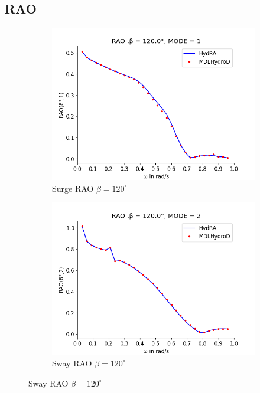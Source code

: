 \subsection{RAO}
\begin{figure}[H]
    \centering
    \begin{subfigure}[b]{0.49\textwidth}
        \includegraphics[width=\textwidth]{plots/kcs/rao/rao1.png}
        \caption{Surge RAO $\beta = 120^{\circ}$}
    \end{subfigure}
    \begin{subfigure}[b]{0.49\textwidth}
        \includegraphics[width=\textwidth]{plots/kcs/rao/rao2.png}
        \caption{Sway RAO $\beta = 120^{\circ}$}
    \end{subfigure}

\end{figure}
